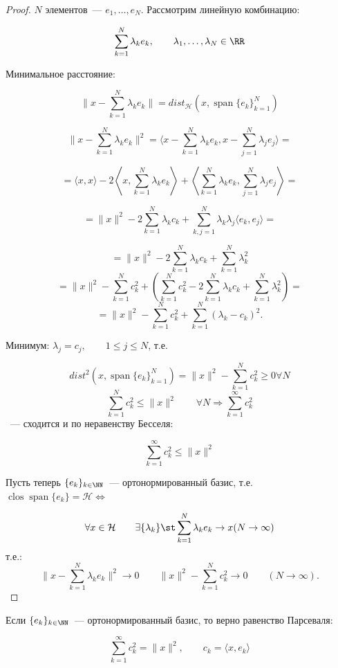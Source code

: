 \begin{proof}
	$N$ элементов~--- $e_1, \ldots, e_N$. Рассмотрим линейную комбинацию:
	
	\[ \sum_{k=1}^N \lambda_k e_k, \qquad \lambda_1, \ldots, \lambda_N \in \RR \]
	
	Минимальное расстояние:
	
	\[  \|x - \sum_{k=1}^N \lambda_k e_k\|  = dist_{\mathcal{H}}(x, \operatorname{span}\{ e_k\}_{k=1}^N) \]
	
	\[  \|x - \sum_{k=1}^N \lambda_k e_k\| ^2 =  \langle x - \sum_{k=1}^N \lambda_k e_k, x - \sum_{j=1}^N \lambda_j e_j \rangle  = \]
	
	\[ = \langle x,x \rangle - 2\left\langle x, \sum_{k=1}^N \lambda_k e_k \right\rangle + \left\langle \sum_{k=1}^N \lambda_k e_k, \sum_{j=1}^N \lambda_j e_j \right\rangle = \]
	
	\[ = \|x\|^2 - 2\sum_{k=1}^N \lambda_k c_k + \sum_{k,j=1}^N \lambda_k\lambda_j \langle e_k,e_j \rangle = \]
	
	\[ =  \|x\|^2 - 2 \sum_{k=1}^N\lambda_k c_k + \sum_{k=1}^N \lambda_k^2 \]
	\[ =  \|x\|^2 - \sum_{k=1}^N c_k^2 + (\sum_{k=1}^Nc_k^2 - 2\sum_{k=1}^N\lambda_k c_k + \sum_{k=1}^N \lambda_k^2) = \] 
	\[ = \|x\|^2 - \sum_{k=1}^N c_k^2 + \sum_{k=1}^N(\lambda_k - c_k)^2. \]
	
	
	
	Минимум: $\lambda_j = c_j, \qquad 1 \le j \le N$, т.е.
	
	\[ dist^2(x, \operatorname{span}\{e_k\}_{k=1}^N) =  \|x\|^2 - \sum_{k=1}^Nc_k^2 \ge 0  \forall  N \]
	\[ \sum_{k=1}^N c_k^2 \le  \|x\|^2 \qquad \forall N  \Rightarrow \sum_{k=1}^\infty c_k^2 \] ~--- сходится и по неравенству Бесселя:
	
	\[ \sum_{k=1}^\infty c_k^2 \le  \|x\|^2 \]
	
	Пусть теперь $\{ e_k\}_{k \in \NN}$~--- ортонормированный базис, т.е. $\operatorname{clos}  \operatorname{span} \{ e_k \} = \mathcal{H} \Leftrightarrow$
	
	\[ \forall  x \in \mathcal{H} \qquad \exists  \{\lambda_k\} \st \sum_{k=1}^N \lambda_k e_k \rightarrow x (N \rightarrow \infty) \] т.е.:
	\[  \|x - \sum_{k=1}^N \lambda_k e_k\| ^2 \longrightarrow 0 \qquad \|x\|^2 - \sum_{k=1}^N c_k^2 \longrightarrow 0 \qquad (N \rightarrow \infty). \]
\end{proof}

\begin{Proposition}{}{}
	Если $\{ e_k\}_{k \in \NN}$~--- ортонормированный базис, то верно равенство Парсеваля:
	
	\[ \sum_{k=1}^\infty c_k^2 = \|x\|^2, \qquad c_k = \langle x, e_k \rangle  \]
\end{Proposition}


